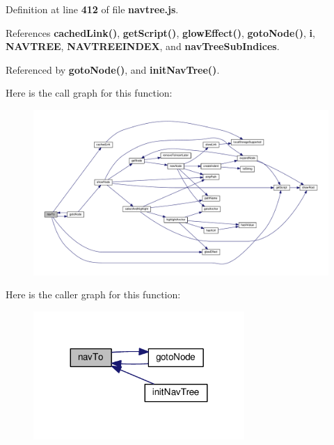 Definition at line {\bf 412} of file {\bf navtree.\+js}.



References {\bf cached\+Link()}, {\bf get\+Script()}, {\bf glow\+Effect()}, {\bf goto\+Node()}, {\bf i}, {\bf N\+A\+V\+T\+R\+EE}, {\bf N\+A\+V\+T\+R\+E\+E\+I\+N\+D\+EX}, and {\bf nav\+Tree\+Sub\+Indices}.



Referenced by {\bf goto\+Node()}, and {\bf init\+Nav\+Tree()}.



Here is the call graph for this function\+:
\nopagebreak
\begin{figure}[H]
\begin{center}
\leavevmode
\includegraphics[width=350pt]{d6/d95/navtree_8js_a21beb601032fff375100a907f32129a5_cgraph}
\end{center}
\end{figure}




Here is the caller graph for this function\+:
\nopagebreak
\begin{figure}[H]
\begin{center}
\leavevmode
\includegraphics[width=227pt]{d6/d95/navtree_8js_a21beb601032fff375100a907f32129a5_icgraph}
\end{center}
\end{figure}


